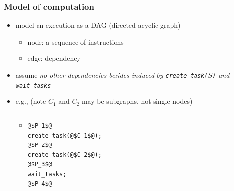 \documentclass[12pt,dvipdfmx]{beamer}
\newcommand{\aka}[1]{{\color{red}#1}}
\begin{document}
\begin{frame}[fragile]
\frametitle{Model of computation}

\begin{itemize}
\item model an execution as a DAG (directed acyclic graph)
  \begin{itemize}
  \item node: a sequence of instructions
  \item edge: dependency
  \end{itemize}

\item assume \aka{\em no other dependencies
    besides induced by {\tt create\_task($S$)} and
    {\tt wait\_tasks}}

\item e.g., (note $C_1$ and $C_2$ may be subgraphs, not single nodes)

\begin{columns}
\begin{column}{0.6\textwidth}
\begin{itemize}
\item []
\begin{lstlisting}
@$P_1$@
create_task(@$C_1$@);
@$P_2$@
create_task(@$C_2$@);
@$P_3$@
wait_tasks;
@$P_4$@
\end{lstlisting}
\end{itemize}
\end{column}
\begin{column}{0.4\textwidth}
\begin{center}
\def\svgwidth{0.4\textwidth}
{\scriptsize }
\end{center}
\end{column}
\end{columns}
\end{itemize}
\end{frame}
\end{document}
